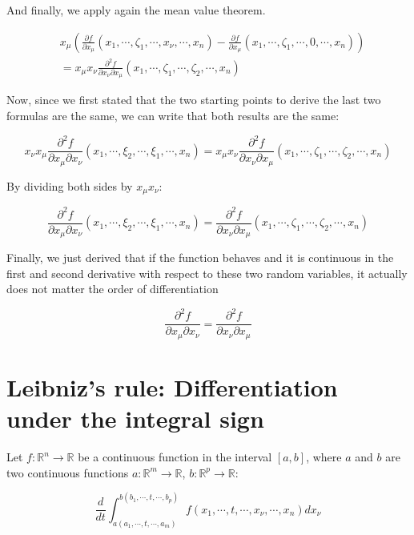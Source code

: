 \documentclass[12pt]{article}
\begin{document}
	And finally, we apply again the mean value theorem.
	
	\[
		\begin{aligned}
			& x_\mu \left( \frac{\partial f}{\partial x_\mu}(x_1, \cdots, \zeta_1,\cdots, x_\nu, \cdots, x_n) - \frac{\partial f}{\partial x_\mu}(x_1, \cdots, \zeta_1, \cdots, 0, \cdots, x_n) \right)
			\\
			& = x_\mu x_\nu \frac{\partial^2 f}{\partial x_\nu \partial x_\mu} (x_1, \cdots, \zeta_1, \cdots, \zeta_2, \cdots, x_n)
		\end{aligned}
	\]
	
	Now, since we first stated that the two starting points to derive the last two formulas are the same, we can write that both results are the same:
	
	\[
		x_\nu x_\mu \frac{\partial^2 f}{\partial x_\mu \partial x_\nu}(x_1, \cdots, \xi_2, \cdots, \xi_1, \cdots, x_n)
		= x_\mu x_\nu \frac{\partial^2 f}{\partial x_\nu \partial x_\mu} (x_1, \cdots, \zeta_1, \cdots, \zeta_2, \cdots, x_n)
	\]
	
	By dividing both sides by $x_\mu x_\nu$:
	
	\[
		\frac{\partial^2 f}{\partial x_\mu \partial x_\nu}(x_1, \cdots, \xi_2, \cdots, \xi_1, \cdots, x_n)
		= \frac{\partial^2 f}{\partial x_\nu \partial x_\mu} (x_1, \cdots, \zeta_1, \cdots, \zeta_2, \cdots, x_n)
	\]
	
	Finally, we just derived that if the function behaves and it is continuous in the first and second derivative with respect to these two random variables, it actually does not matter the order of differentiation
	
	\[
		\frac{\partial^2 f}{\partial x_\mu \partial x_\nu} = \frac{\partial^2 f}{\partial x_\nu \partial x_\mu}
	\]
	
	\section{Leibniz's rule: Differentiation under the integral sign}
	
	Let $f : \mathbb{R}^n \to \mathbb{R}$ be a continuous function in the interval $[a, b]$, where $a$ and $b$ are two continuous functions $a : \mathbb{R}^m \to \mathbb{R}$, $b : \mathbb{R}^p \to \mathbb{R}$:
	
	\[
		\frac{d}{dt} \int_{a(a_1, \cdots, t, \cdots, a_m)}^{b(b_1, \cdots, t, \cdots, b_p)} f(x_1, \cdots, t, \cdots, x_\nu, \cdots, x_n) dx_\nu
	\]
	
\end{document}
